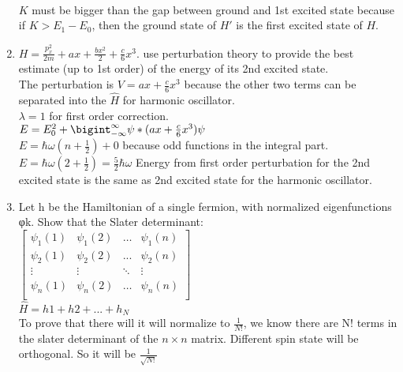 \documentclass[a4paper,12pt]{article}
\begin{document}
\begin{enumerate}
\\ $K$ must be bigger than the gap between ground and 1st excited state because if $K>E_1-E_0$, then the ground state of $H'$ is the first excited state of $H$.
\item $H=\frac{p_x^2}{2m}+ax+\frac{bx^2}{2}+\frac{c}{6}x^3$. use perturbation theory to provide the best estimate (up to 1st order) of the energy of its 2nd excited
state.
\\ The perturbation is $V=ax+\frac{c}{6}x^3$ because the other two terms can be separated into the $\hat{H}$ for harmonic oscillator.
\\ $\lambda=1$ for first order correction. 
\\ $E=E_0^2+\bigint_{-\infty}^{\infty}\psi*(ax+\frac{c}{6}x^3)\psi$
\\ $E=\hbar\omega(n+\frac{1}{2})+0$ because odd functions in the integral part. 
\\ $E=\hbar\omega(2+\frac{1}{2})=\frac{5}{2}\hbar\omega$ Energy from first order perturbation for the 2nd excited state is the same as 2nd excited state for the harmonic oscillator. 
\item Let h be the Hamiltonian of a single fermion, with normalized eigenfunctions {φk}. Show
that the Slater determinant:
\\ \begin{math}
    \begin{bmatrix}
    \psi_1(1) & \psi_1(2) & \hdots & \psi_1(n) \\
    \psi_2(1) & \psi_2(2) & ... & \psi_2(n) \\ 
    \vdots & \vdots & \ddots & \vdots \\
    \psi_n(1) & \psi_n(2) & \hdots & \psi_n(n) \\ 
    \end{bmatrix}
    \end{math}
\\ $\hat{H}= h1+h2+...+h_N$
\\ To prove that there will it will normalize to $\frac{1}{N!}$, we know there are N! terms in the slater determinant of the $n \times n$ matrix. Different spin state will be orthogonal. So it will be $\frac{1}{\sqrt{N!}}$
\end{enumerate}%
\end{document}
